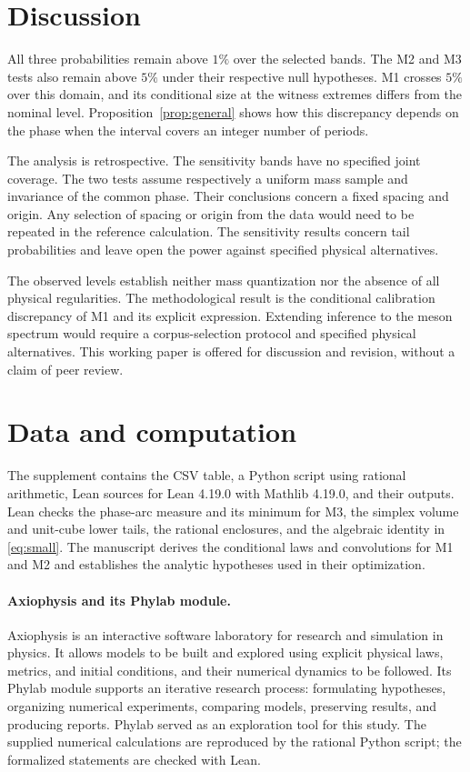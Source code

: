 \documentclass[11pt,a4paper]{article}
\begin{document}
\section{Discussion}

All three probabilities remain above $1\%$ over the selected bands. The M2 and M3 tests also remain above $5\%$ under their respective null hypotheses. M1 crosses $5\%$ over this domain, and its conditional size at the witness extremes differs from the nominal level. Proposition~\ref{prop:general} shows how this discrepancy depends on the phase when the interval covers an integer number of periods.

The analysis is retrospective. The sensitivity bands have no specified joint coverage. The two tests assume respectively a uniform mass sample and invariance of the common phase. Their conclusions concern a fixed spacing and origin. Any selection of spacing or origin from the data would need to be repeated in the reference calculation. The sensitivity results concern tail probabilities and leave open the power against specified physical alternatives.

The observed levels establish neither mass quantization nor the absence of all physical regularities. The methodological result is the conditional calibration discrepancy of M1 and its explicit expression. Extending inference to the meson spectrum would require a corpus-selection protocol and specified physical alternatives. This working paper is offered for discussion and revision, without a claim of peer review.

\section*{Data and computation}

The supplement contains the CSV table, a Python script using rational arithmetic, Lean sources for Lean 4.19.0 with Mathlib 4.19.0, and their outputs. Lean checks the phase-arc measure and its minimum for M3, the simplex volume and unit-cube lower tails, the rational enclosures, and the algebraic identity in \eqref{eq:small}. The manuscript derives the conditional laws and convolutions for M1 and M2 and establishes the analytic hypotheses used in their optimization.

\paragraph{Axiophysis and its Phylab module.}
Axiophysis is an interactive software laboratory for research and simulation in physics. It allows models to be built and explored using explicit physical laws, metrics, and initial conditions, and their numerical dynamics to be followed. Its Phylab module supports an iterative research process: formulating hypotheses, organizing numerical experiments, comparing models, preserving results, and producing reports. Phylab served as an exploration tool for this study. The supplied numerical calculations are reproduced by the rational Python script; the formalized statements are checked with Lean.
\end{document}
